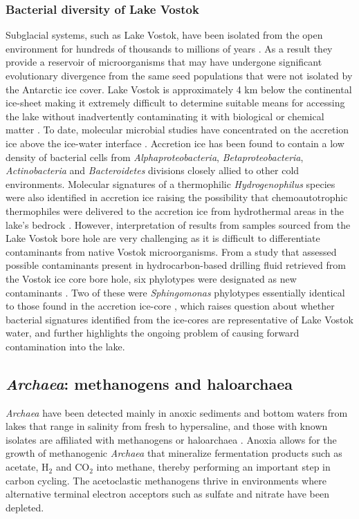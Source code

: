 \subsubsection{Bacterial diversity of Lake Vostok}
Subglacial systems, such as Lake Vostok, have been isolated from the open environment for hundreds of thousands to millions of years \cite{Siegert2001}.
As a result they provide a reservoir of microorganisms that may have undergone significant evolutionary divergence from the same seed populations that were not isolated by the Antarctic ice cover. 
Lake Vostok is approximately 4 km below the continental ice-sheet making it extremely difficult to determine suitable means for accessing the lake without inadvertently contaminating it with biological
 or chemical matter \cite{Inman2005, Wingham2006, Lukin2011, Gramling2012, Jones2012}. 
To date, molecular microbial studies have concentrated on the accretion ice above the ice-water interface \cite{Priscu1999, Christner2001}.
Accretion ice has been found to contain a low density of bacterial cells from \emph{Alphaproteobacteria}, \emph{Betaproteobacteria}, \emph{Actinobacteria} and \emph{Bacteroidetes} divisions closely allied to other cold environments.
Molecular signatures of a thermophilic \emph{Hydrogenophilus} species were also identified in accretion ice 
raising the possibility that chemoautotrophic thermophiles were delivered to the accretion ice from hydrothermal areas in the lake’s bedrock \cite{Bulat2004, Lavire2007}.
However, interpretation of results from samples sourced from the Lake Vostok bore hole are very challenging as it is difficult to differentiate contaminants from native Vostok microorganisms.
From a study that assessed possible contaminants present in hydrocarbon-based drilling fluid retrieved from the Vostok ice core bore hole, 
six phylotypes were designated as new contaminants \cite{Alekhina2007}. 
Two of these were \emph{Sphingomonas} phylotypes essentially identical to those found in the accretion ice-core \cite{Christner2001},
 which raises question about whether bacterial signatures identified from the ice-cores are representative of Lake Vostok water,
 and further highlights the ongoing problem of causing forward contamination into the lake.

\subsection{\emph{Archaea}: methanogens and haloarchaea}
\emph{Archaea} have been detected mainly in anoxic sediments and bottom waters from lakes that range in salinity from fresh to hypersaline, 
and those with known isolates are affiliated with methanogens or haloarchaea \cite{Bowman2000, Bowman2000a, Purdy2003, Kurosawa2010, Lauro2011}.
Anoxia allows for the growth of methanogenic \emph{Archaea} that mineralize fermentation products such as acetate, H$_2$ and CO$_2$ into methane, thereby performing an important step in carbon cycling.
The acetoclastic methanogens thrive in environments where alternative terminal electron acceptors such as sulfate and nitrate have been depleted. 

